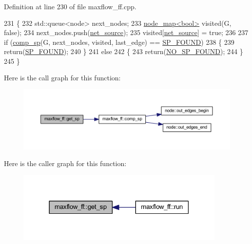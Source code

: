 Definition at line 230 of file maxflow\+\_\+ff.\+cpp.


\begin{DoxyCode}
231 \{
232     std::queue<node> next\_nodes;
233     \mbox{\hyperlink{classnode__map}{node\_map<bool>}} visited(G, \textcolor{keyword}{false});
234     next\_nodes.push(\mbox{\hyperlink{classmaxflow__ff_a2e4cc02ce8c9d929f2896525c686d6c1}{net\_source}});
235     visited[\mbox{\hyperlink{classmaxflow__ff_a2e4cc02ce8c9d929f2896525c686d6c1}{net\_source}}] = \textcolor{keyword}{true};
236 
237     \textcolor{keywordflow}{if} (\mbox{\hyperlink{classmaxflow__ff_afefc972c43e8eb031abaac1451473f9c}{comp\_sp}}(G, next\_nodes, visited, last\_edge) == \mbox{\hyperlink{classmaxflow__ff_a08dc6e5c5fe20a9f9d93721f8c273592acf4f271b476cce9871e48ba446283d64}{SP\_FOUND}})
238     \{
239     \textcolor{keywordflow}{return}(\mbox{\hyperlink{classmaxflow__ff_a08dc6e5c5fe20a9f9d93721f8c273592acf4f271b476cce9871e48ba446283d64}{SP\_FOUND}});
240     \}
241     \textcolor{keywordflow}{else}
242     \{
243     \textcolor{keywordflow}{return}(\mbox{\hyperlink{classmaxflow__ff_a08dc6e5c5fe20a9f9d93721f8c273592adc2a7638ed9e892fb272d6b9e1dda399}{NO\_SP\_FOUND}});
244     \}
245 \}
\end{DoxyCode}
Here is the call graph for this function\+:\nopagebreak
\begin{figure}[H]
\begin{center}
\leavevmode
\includegraphics[width=350pt]{classmaxflow__ff_a532b1285a791d23ab318791bc093fde7_cgraph}
\end{center}
\end{figure}
Here is the caller graph for this function\+:\nopagebreak
\begin{figure}[H]
\begin{center}
\leavevmode
\includegraphics[width=294pt]{classmaxflow__ff_a532b1285a791d23ab318791bc093fde7_icgraph}
\end{center}
\end{figure}
\mbox{\label{classmaxflow__ff_a8ad20b45a7d30070bb65e68758c2f7d3}} 
